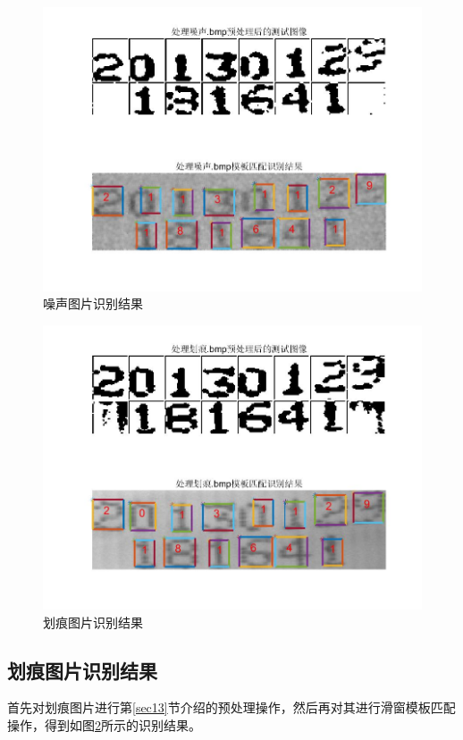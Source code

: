 \documentclass[cn]{elegantbook}
\begin{document}
\begin{figure}[!h]
	\centering
	\includegraphics[width=\textwidth]{save8}
	\caption{\label{hua2}噪声图片识别结果}
\end{figure}
\begin{figure}[!h]
	\centering
	\includegraphics[width=\textwidth]{save7}
	\caption{\label{hua3}划痕图片识别结果}
\end{figure}

\subsection{划痕图片识别结果}

首先对划痕图片进行第\ref{sec13}节介绍的预处理操作，然后再对其进行滑窗模板匹配操作，得到如图\ref{hua3}所示的识别结果。
\end{document}
